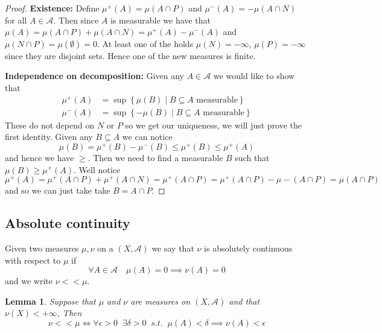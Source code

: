\documentclass[11pt]{article}
\newcommand{\relmiddle}[1]{\mathrel{}\middle#1\mathrel{}}
\newcommand{\rmv}{\relmiddle|}
\newenvironment{defin}
	{\begin{mdframed}[backgroundcolor=white, roundcorner=5pt, linewidth=1pt]}
	{\end{mdframed}}
\newcommand{\mdf}[1]{{\color{red} #1}}
\newtheorem{lemma}[theorem]{Lemma}
\begin{document}
\begin{proof}
\textbf{Existence:}
Define $\mu^+(A)=\mu(A\cap P)$ and $\mu^-(A) = - \mu(A\cap N)$ for all $A\in\mathcal{A}$.
Then since $A$ is measurable we have that $\mu(A) = \mu(A\cap P) + \mu(A \cap N) = \mu^+(A) - \mu^-(A)$ and $\mu(N\cap P) = \mu(\emptyset)=0$.
At least one of the holds $\mu(N)=-\infty$, $\mu(P)=-\infty$ since they are disjoint sets.
Hence one of the new measures is finite.

\textbf{Independence on decomposition:}
Given any $A\in\mathcal{A}$ we would like to show that 
\begin{align*}
	\mu^+(A) &= \sup\left\{\mu(B) \rmv B\subseteq A \text{ measurable}\right\}\\
	\mu^-(A) &= \sup\left\{-\mu(B) \rmv B\subseteq A \text{ measurable}\right\}
\end{align*}
These do not depend on $N$ or $P$ so we get our uniqueness, we will just prove the first identity.
Given any $B\subseteq A$ we can notice
\[
	\mu(B) = \mu^+(B) - \mu^-(B) \leq \mu^+(B) \leq \mu^+(A)
\]
and hence we have $\geq$.
Then we need to find a measurable $B$ such that $\mu(B) \geq \mu^+(A)$.
Well notice
\[
\mu^+(A)=\mu^+(A\cap P) + \mu^+(A\cap N) = \mu^+(A\cap P) = \mu^+(A\cap P) - \mu-(A\cap P) = \mu(A \cap P)
\]
and so we can just take take $B=A \cap P$.
\end{proof}

\subsection{Absolute continuity}
\begin{defin}
	Given two measures $\mu, \nu$ on a $(X, \mathcal{A})$ we say that $\nu$ is \mdf{absolutely continuous} with respect to $\mu$ if 
	\[
		\forall A \in \mathcal{A} \quad \mu(A) = 0 \implies \nu(A) = 0
	\]
	and we write $\nu << \mu$.
\end{defin}

\begin{lemma}
Suppose that $\mu$ and $\nu$ are measures on $(X, \mathcal{A})$ and that $\nu(X) < +\infty$, Then
\[
	\nu << \mu \iff \forall \epsilon >0 \;\; \exists \delta >0 \;\; s.t. \;\; \mu(A) < \delta \implies \nu(A) < \epsilon
\]
\end{lemma}
\end{document}
